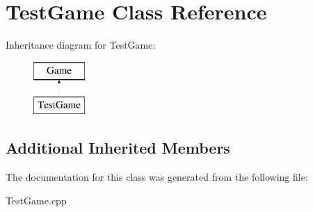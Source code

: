 \hypertarget{class_test_game}{\section{Test\-Game Class Reference}
\label{class_test_game}
}
Inheritance diagram for Test\-Game\-:\begin{figure}[H]
\begin{center}
\leavevmode
\includegraphics[height=2.000000cm]{class_test_game}
\end{center}
\end{figure}
\subsection*{Additional Inherited Members}


The documentation for this class was generated from the following file\-:\begin{DoxyCompactItemize}
\item 
Test\-Game.\-cpp\end{DoxyCompactItemize}
